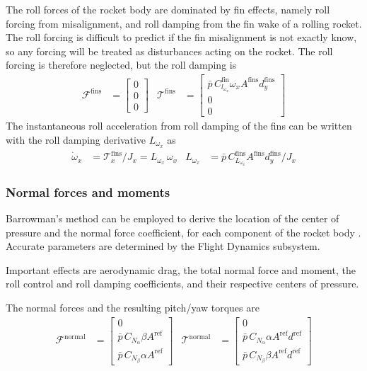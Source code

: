 The roll forces of the rocket body are dominated by fin effects, namely roll forcing from misalignment, and roll damping from the fin wake of a rolling rocket. 
The roll forcing is difficult to predict if the fin misalignment is not exactly know, so any forcing will be treated as disturbances acting on the rocket.
The roll forcing is therefore neglected, but the roll damping is 
\begin{align}
    \mathcal{F}^\text{fins} &= \begin{bmatrix} 0 \\ 0 \\ 0 \end{bmatrix}
    & 
    \mathcal{T}^\text{fins} &= \begin{bmatrix} \bar p \, C^\text{fin}_{l_{\omega_x}} \omega_x A^\text{fins} d^\text{fins}_y \\ 0 \\ 0 \end{bmatrix}
\end{align}
The instantaneous roll acceleration from roll damping of the fins can be written with the roll damping derivative $L_{\omega_x}$ as 
\begin{align}
    \dot \omega_x &= \mathcal{T}^\text{fins}_x / J_x = L_{\omega_x} \, \omega_x
    & 
    L_{\omega_x} &= \bar p \, C^\text{fins}_{L_{\omega_x}} A^\text{fins} d^\text{fins}_y / J_x
\end{align}


\subsubsection{Normal forces and moments}
Barrowman's method can be employed to derive the location of the center of pressure and the normal force coefficient, for each component of the rocket body \cite{barrowman1967, niskanen2009}.
Accurate parameters are determined by the Flight Dynamics subsystem.

Important effects are aerodynamic drag, the total normal force and moment, the roll control and roll damping coefficients, and their respective centers of pressure.

The normal forces and the resulting pitch/yaw torques are 
\begin{align}
    \mathcal{F}^\text{normal} &= 
    \begin{bmatrix} 
    0 \\ 
    \bar p \, C_{N_\alpha} \beta A^\text{ref} \\ 
    \bar p \, C_{N_\beta} \alpha A^\text{ref}
    \end{bmatrix}
    & 
    \mathcal{T}^\text{normal} &= 
    \begin{bmatrix} 
    0 \\
    \bar p \, C_{N_\alpha} \alpha A^\text{ref} d^\text{ref} \\
    \bar p \, C_{N_\beta} \beta A^\text{ref} d^\text{ref}
    \end{bmatrix}
\end{align}


